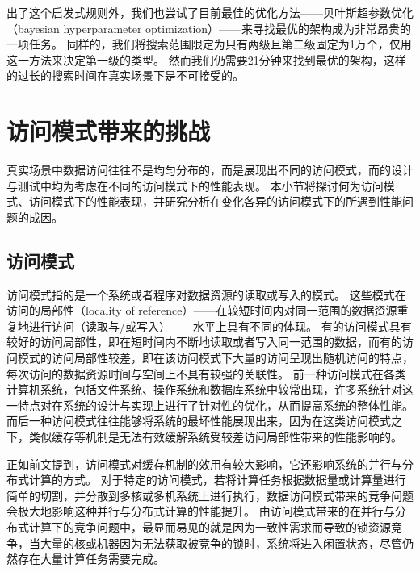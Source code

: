 出了这个启发式规则外，我们也尝试了目前最佳的优化方法{------}贝叶斯超参数优化（bayesian hyperparameter optimization）{------}来寻找最优的{\li}架构成为非常昂贵的一项任务。
同样的，我们将搜索范围限定为只有两级且第二级固定为1万个{\lr}，仅用这一方法来决定第一级的{\model}类型。
然而我们仍需要21分钟来找到最优的架构，这样的过长的搜索时间在真实场景下是不可接受的。


\section{访问模式带来的挑战}

真实场景中数据访问往往不是均匀分布的，而是展现出不同的访问模式，而{\li}的设计与测试中均为考虑在不同的访问模式下的性能表现。
本小节将探讨何为访问模式、访问模式下{\li}的性能表现，并研究分析{\li}在变化各异的访问模式下的所遇到性能问题的成因。

\subsection{访问模式}

访问模式指的是一个系统或者程序对数据资源的读取或写入的模式。
这些模式在访问的局部性（locality of reference）{------}在较短时间内对同一范围的数据资源重复地进行访问（读取与/或写入）{------}水平上具有不同的体现。
有的访问模式具有较好的访问局部性，即在短时间内不断地读取或者写入同一范围的数据，而有的访问模式的访问局部性较差，即在该访问模式下大量的访问呈现出随机访问的特点，
每次访问的数据资源时间与空间上不具有较强的关联性。
前一种访问模式在各类计算机系统，包括文件系统、操作系统和数据库系统中较常出现，许多系统针对这一特点对在系统的设计与实现上进行了针对性的优化，从而提高系统的整体性能。
而后一种访问模式往往能够将系统的最坏性能展现出来，因为在这类访问模式之下，类似缓存等机制是无法有效缓解系统受较差访问局部性带来的性能影响的。

正如前文提到，访问模式对缓存机制的效用有较大影响，它还影响系统的并行与分布式计算的方式。
对于特定的访问模式，若将计算任务根据数据量或计算量进行简单的切割，并分散到多核或多机系统上进行执行，数据访问模式带来的竞争问题会极大地影响这种并行与分布式计算的性能提升。
由访问模式带来的在并行与分布式计算下的竞争问题中，最显而易见的就是因为一致性需求而导致的锁资源竞争，当大量的核或机器因为无法获取被竞争的锁时，系统将进入闲置状态，尽管仍然存在大量计算任务需要完成。

